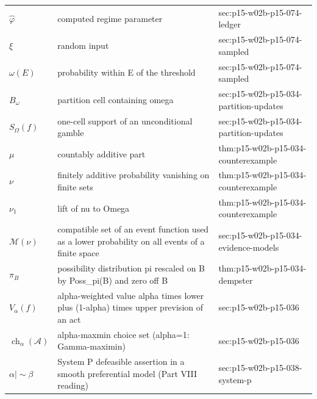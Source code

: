 \begin{longtable}{@{}p{}p{}p{}@{}}
\(\widehat\varphi\) & computed regime parameter & sec:\allowbreak{}p15-\allowbreak{}w02b-\allowbreak{}p15-\allowbreak{}074-\allowbreak{}led{}ger \\
\(\xi\) & random input & sec:\allowbreak{}p15-\allowbreak{}w02b-\allowbreak{}p15-\allowbreak{}074-\allowbreak{}sampled \\
\(\omega(E)\) & probability within E of the threshold & sec:\allowbreak{}p15-\allowbreak{}w02b-\allowbreak{}p15-\allowbreak{}074-\allowbreak{}sampled \\
\(B_\omega\) & partition cell containing omega & sec:\allowbreak{}p15-\allowbreak{}w02b-\allowbreak{}p15-\allowbreak{}034-\allowbreak{}partition-\allowbreak{}updates \\
\(S_\Omega(f)\) & one-cell support of an unconditional gamble & sec:\allowbreak{}p15-\allowbreak{}w02b-\allowbreak{}p15-\allowbreak{}034-\allowbreak{}partition-\allowbreak{}updates \\
\(\mu\) & countably additive part & thm:\allowbreak{}p15-\allowbreak{}w02b-\allowbreak{}p15-\allowbreak{}034-\allowbreak{}counterexample \\
\(\nu\) & finitely additive probability vanishing on finite sets & thm:\allowbreak{}p15-\allowbreak{}w02b-\allowbreak{}p15-\allowbreak{}034-\allowbreak{}counterexample \\
\(\nu_1\) & lift of nu to Omega & thm:\allowbreak{}p15-\allowbreak{}w02b-\allowbreak{}p15-\allowbreak{}034-\allowbreak{}counterexample \\
\(\mathcal M(\nu)\) & compatible set of an event function used as a lower probability on all events of a finite space & sec:\allowbreak{}p15-\allowbreak{}w02b-\allowbreak{}p15-\allowbreak{}034-\allowbreak{}evidence-\allowbreak{}models \\
\(\pi_B\) & possibility distribution pi rescaled on B by Poss\_pi(B) and zero off B & thm:\allowbreak{}p15-\allowbreak{}w02b-\allowbreak{}p15-\allowbreak{}034-\allowbreak{}dempster \\
\(V_\alpha(f)\) & alpha-weighted value alpha times lower plus (1-alpha) times upper prevision of an act & sec:\allowbreak{}p15-\allowbreak{}w02b-\allowbreak{}p15-\allowbreak{}036 \\
\(\operatorname{ch}_\alpha(\mathcal A)\) & alpha-maxmin choice set (alpha=1: Gamma-maximin) & sec:\allowbreak{}p15-\allowbreak{}w02b-\allowbreak{}p15-\allowbreak{}036 \\
\(\alpha\mathrel{|\!\sim}\beta\) & System P defeasible assertion in a smooth preferential model (Part VIII reading) & sec:\allowbreak{}p15-\allowbreak{}w02b-\allowbreak{}p15-\allowbreak{}038-\allowbreak{}system-\allowbreak{}p \\

\end{longtable}
